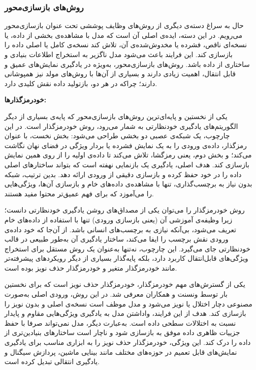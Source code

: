\subsubsection{روش‌های بازسازی‌محور}

حال به سراغ دسته‌ی دیگری از روش‌های وظایف پوششی تحت عنوان بازسازی‌محور می‌رویم. در این دسته، ایده‌ی اصلی آن است که مدل با مشاهده‌ی بخشی از داده، یا نسخه‌ای ناقص، فشرده یا مخدوش‌شده‌ی آن، تلاش کند نسخه‌ی کامل یا اصلی داده را بازسازی کند. این فرایند باعث می‌شود مدل ناگزیر به استخراج اطلاعات بنیادی و ساختاری از داده باشد. روش‌های بازسازی‌محور، به‌ویژه در یادگیری نمایش‌های عمیق و قابل انتقال، اهمیت زیادی دارند و بسیاری از آن‌ها با روش‌های مولد نیز همپوشانی دارند؛ چراکه در هر دو، بازتولید داده نقش کلیدی دارد.\newline

\noindent\textbf{خودرمزگذارها:}

یکی از نخستین و پایه‌ای‌ترین روش‌های بازسازی‌محور که پایه‌ی بسیاری از دیگر الگوریتم‌های یادگیری خودنظارتی به شمار می‌رود، روش خودر‌مزگذار است. در این چارچوب، یک شبکه‌ی عصبی دو بخشی طراحی می‌شود: بخش نخست، با عنوان رمزگذار، داده‌ی ورودی را به یک نمایش فشرده یا بردار ویژگی در فضای نهان نگاشت می‌کند؛ و بخش دوم، یعنی رمزگشا، تلاش می‌کند تا داده‌ی اولیه را از روی همین نمایش بازسازی کند. هدف اصلی، یادگیری یک بازنمایی نهفته است که بتواند ساختارهای اصلی داده را در خود حفظ کرده و بازسازی دقیقی از ورودی ارائه دهد. بدین ترتیب، شبکه بدون نیاز به برچسب‌گذاری، تنها با مشاهده‌ی داده‌های خام و بازسازی آن‌ها، ویژگی‌هایی را می‌آموزد که برای فهم عمیق‌تر محتوا مفید هستند.

روش خودرمزگذار را می‌توان یکی از مصداق‌های روشن یادگیری خودنظارتی دانست؛ زیرا وظیفه‌ی آموزشی آن (یعنی بازسازی ورودی) تنها با استفاده از داده‌های خام تعریف می‌شود، بی‌آنکه نیازی به برچسب‌های انسانی باشد. از آن‌جا که خود داده‌ی ورودی نقش برچسب را ایفا می‌کند، ساختار یادگیری آن به‌طور طبیعی در قالب خودنظارتی جای می‌گیرد. این چارچوب، نه‌تنها به‌عنوان یک روش مستقل برای استخراج ویژگی‌های قابل‌انتقال کاربرد دارد، بلکه پایه‌گذار بسیاری از دیگر رویکردهای پیشرفته‌تر مانند خودر‌مزگذار متغیر و خودرمزگذار حذف نویز بوده است.

یکی از گسترش‌های مهم خودرمزگذار، خودر‌مزگذار حذف نویز است که برای نخستین بار توسط ونسنت و همکاران \cite{vincent2008extracting} معرفی شد. در این روش، ورودی اصلی به‌صورت مصنوعی دچار اختلال یا نویز می‌شود و مدل موظف است نسخه‌ی اصلی و بدون نویز را بازسازی کند. هدف از این فرایند، واداشتن مدل به یادگیری ویژگی‌هایی مقاوم و پایدار نسبت به اختلالات سطحی داده است. به‌عبارت دیگر، مدل نمی‌تواند صرفا با حفظ جزییات ظاهری داده موفق به بازسازی شود و ناچار است ساختارهای بنیادین‌تری از داده را درک کند. این ویژگی، خودرمزگذار حذف نویز را به ابزاری مناسب برای یادگیری نمایش‌های قابل تعمیم در حوزه‌های مختلف مانند بینایی ماشین، پردازش سیگنال و یادگیری انتقالی تبدیل کرده است.\newline


